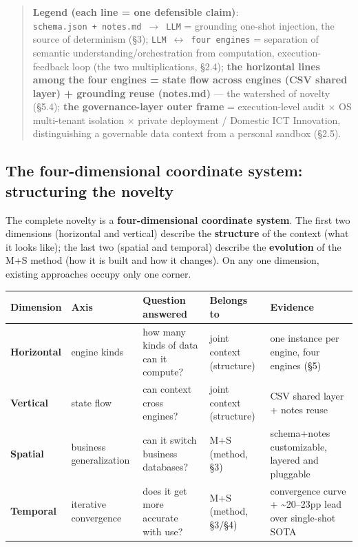 \documentclass[11pt]{article}
\begin{document}
\begin{quote}
\textbf{Legend (each line = one defensible claim)}: \texttt{schema.json\ +\ notes.md\ $\rightarrow$\ LLM} = grounding one-shot injection, the source of determinism (\S{}3); \texttt{LLM\ $\leftrightarrow$\ four\ engines} = separation of semantic understanding/orchestration from computation, execution-feedback loop (the two multiplications, \S{}2.4); \textbf{the horizontal lines among the four engines = state flow across engines (CSV shared layer) + grounding reuse (notes.md)} --- the watershed of novelty (\S{}5.4); \textbf{the governance-layer outer frame} = execution-level audit $\times$ OS multi-tenant isolation $\times$ private deployment / Domestic ICT Innovation, distinguishing a governable data context from a personal sandbox (\S{}2.5).
\end{quote}

\subsection{The four-dimensional coordinate system: structuring the novelty}

The complete novelty is a \textbf{four-dimensional coordinate system}. The first two dimensions (horizontal and vertical) describe the \textbf{structure} of the context (what it looks like); the last two (spatial and temporal) describe the \textbf{evolution} of the M+S method (how it is built and how it changes). On any one dimension, existing approaches occupy only one corner.

{\small
\begin{tabular}{@{}
  >{\raggedright\arraybackslash}p{}
  >{\raggedright\arraybackslash}p{}
  >{\raggedright\arraybackslash}p{}
  >{\raggedright\arraybackslash}p{}
  >{\raggedright\arraybackslash}p{}@{}}
\toprule
Dimension & Axis & Question answered & Belongs to & Evidence \\
\midrule
\textbf{Horizontal} & engine kinds & how many kinds of data can it compute? & joint context (structure) & one instance per engine, four engines (\S{}5) \\
\textbf{Vertical} & state flow & can context cross engines? & joint context (structure) & CSV shared layer + notes reuse \\
\textbf{Spatial} & business generalization & can it switch business databases? & M+S (method, \S{}3) & schema+notes customizable, layered and pluggable \\
\textbf{Temporal} & iterative convergence & does it get more accurate with use? & M+S (method, \S{}3/\S{}4) & convergence curve + \textasciitilde20--23pp lead over single-shot SOTA \\
\bottomrule
\end{tabular}}
\end{document}
